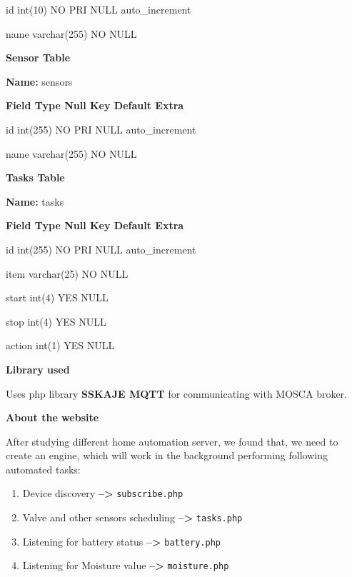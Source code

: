 \documentclass[16pt]{article}
\begin{document}
id \textbar{} int(10) \textbar{} NO \textbar{} PRI \textbar{} NULL
\textbar{} auto\_increment \textbar{}

name \textbar{} varchar(255) \textbar{} NO \textbar{} \textbar{} NULL
\textbar{} \textbar{}

\textbf{Sensor Table}

\textbf{Name:} sensors

\textbf{\textbar{} Field \textbar{} Type \textbar{} Null \textbar{} Key
\textbar{} Default \textbar{} Extra \textbar{}}

id \textbar{} int(255) \textbar{} NO \textbar{} PRI \textbar{} NULL
\textbar{} auto\_increment \textbar{}

name \textbar{} varchar(255) \textbar{} NO \textbar{} \textbar{} NULL
\textbar{}

\textbf{Tasks Table}

\textbf{Name:} tasks

\textbf{\textbar{} Field \textbar{} Type \textbar{} Null \textbar{} Key
\textbar{} Default \textbar{} Extra \textbar{}}

id \textbar{} int(255) \textbar{} NO \textbar{} PRI \textbar{} NULL
\textbar{} auto\_increment \textbar{}

item \textbar{} varchar(25) \textbar{} NO \textbar{} \textbar{} NULL
\textbar{} \textbar{}

start \textbar{} int(4) \textbar{} YES \textbar{} \textbar{} NULL
\textbar{} \textbar{}

stop \textbar{} int(4) \textbar{} YES \textbar{} \textbar{} NULL
\textbar{} \textbar{}

action \textbar{} int(1) \textbar{} YES \textbar{} \textbar{} NULL
\textbar{}


\textbf{Library used}

Uses php library \textbf{SSKAJE MQTT} for communicating with MOSCA
broker.



\textbf{About the website}

After studying different home automation server, we found that, we need
to create an engine, which will work in the background performing
following automated tasks:

\begin{enumerate}

\item Device discovery \textbf{--\textgreater{}}
\texttt{subscribe.php}
\item Valve and other sensors scheduling
\textbf{--\textgreater{}} \texttt{tasks.php} 
\item Listening for battery status \textbf{--\textgreater{}} \texttt{battery.php} 
\item Listening for Moisture value \textbf{--\textgreater{}} \texttt{moisture.php}

\end{enumerate}
\end{document}
